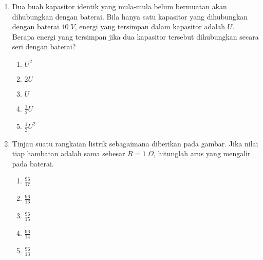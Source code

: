 \documentclass[A4,12PT, english, twocolumn]{journal}
\begin{document}
\begin{enumerate}
\item Dua buah kapasitor identik yang mula-mula belum bermuatan akan dihubungkan dengan baterai. Bila hanya satu kapasitor yang dihubungkan dengan baterai $10 \; V$, energi yang tersimpan dalam kapasitor adalah $U$. Berapa energi yang tersimpan jika dua kapasitor tersebut dihubungkan secara seri dengan baterai?
   \begin{enumerate}
        \item $U^2$
        \item $2U$
        \item $U$
        \item $\frac{1}{2}U$
        \item $\frac{1}{2}U^2$
   \end{enumerate}
   
\item Tinjau suatu rangkaian listrik sebagaimana diberikan pada gambar. Jika nilai tiap hambatan adalah sama sebesar $R=1 \; \Omega$, hitunglah arus yang mengalir pada baterai.
\begin{center}
\end{center}
    \begin{enumerate}
        \item $\frac{96}{17}$
        \item $\frac{96}{16}$
        \item $\frac{96}{15}$
        \item $\frac{96}{14}$
        \item $\frac{96}{13}$
    \end{enumerate}
  

\end{enumerate}
\end{document}
